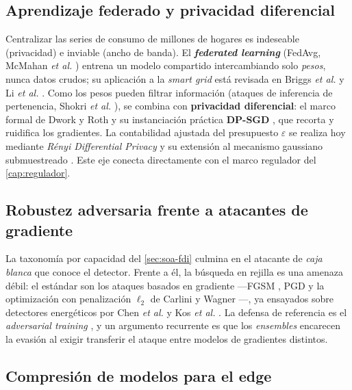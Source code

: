 \subsection{Aprendizaje federado y privacidad diferencial}

Centralizar las series de consumo de millones de hogares es indeseable (privacidad) e inviable (ancho de banda). El \textbf{\textit{federated learning}} (FedAvg, McMahan \emph{et al.} \cite{mcmahan2017fedavg}) entrena un modelo compartido intercambiando solo \emph{pesos}, nunca datos crudos; su aplicación a la \textit{smart grid} está revisada en Briggs \emph{et al.} \cite{briggs2020federated} y Li \emph{et al.} \cite{li2021federated}. Como los pesos pueden filtrar información (ataques de inferencia de pertenencia, Shokri \emph{et al.} \cite{shokri2017membership}), se combina con \textbf{privacidad diferencial}: el marco formal de Dwork y Roth \cite{dwork2014dp} y su instanciación práctica \textbf{DP-SGD} \cite{abadi2016dpsgd}, que recorta y ruidifica los gradientes. La contabilidad ajustada del presupuesto $\varepsilon$ se realiza hoy mediante \emph{Rényi Differential Privacy} \cite{mironov2017rdp} y su extensión al mecanismo gaussiano submuestreado \cite{mironov2019sgm}. Este eje conecta directamente con el marco regulador del \cref{cap:regulador}.

\subsection{Robustez adversaria frente a atacantes de gradiente}

La taxonomía por capacidad del \cref{sec:soa-fdi} culmina en el atacante de \emph{caja blanca} que conoce el detector. Frente a él, la búsqueda en rejilla es una amenaza débil: el estándar son los ataques basados en gradiente ---FGSM \cite{goodfellow2014fgsm}, PGD \cite{madry2018pgd} y la optimización con penalización $\ell_2$ de Carlini y Wagner \cite{carlini2017cw}---, ya ensayados sobre detectores energéticos por Chen \emph{et al.} \cite{chen2018adversarial} y Kos \emph{et al.} \cite{kos2018adversarial}. La defensa de referencia es el \emph{adversarial training} \cite{madry2018pgd}, y un argumento recurrente es que los \emph{ensembles} encarecen la evasión al exigir transferir el ataque entre modelos de gradientes distintos.

\subsection{Compresión de modelos para el edge}

